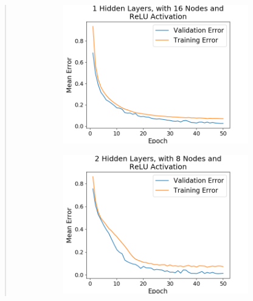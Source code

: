 \documentclass{article}
\begin{document}
\begin{quote}
\begin{figure}[h]
\begin{subfigure}[h]{0.23\textwidth}
		\includegraphics[width=\textwidth]{figs/Iris_Multiclass_Classification_1_Hidden_Layers_with_16_Nodes_and_ReLU_Activation.png}
	\end{subfigure}
	\begin{subfigure}[h]{0.23\textwidth}
		\includegraphics[width=\textwidth]{figs/Iris_Multiclass_Classification_2_Hidden_Layers_with_8_Nodes_and_ReLU_Activation.png}
	\end{subfigure}
	\begin{subfigure}[h]{0.23\textwidth}

\end{subfigure}
\end{figure}
\end{quote}
\end{document}
